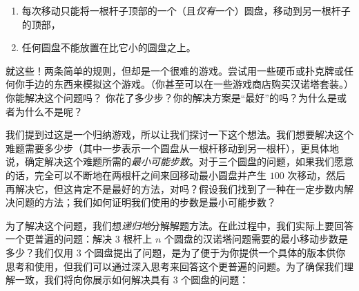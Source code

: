 \begin{enumerate}
    \item 每次移动只能将一根杆子顶部的一个（且\textit{仅有}一个）圆盘，移动到另一根杆子的顶部，
    \item 任何圆盘不能放置在比它小的圆盘之上。
\end{enumerate}
就这些！两条简单的规则，但却是一个很难的游戏。尝试用一些硬币或扑克牌或任何你手边的东西来模拟这个游戏。（你甚至可以在一些游戏商店购买汉诺塔套装。）你能解决这个问题吗？ 你花了多少步？你的解决方案是“最好”的吗？为什么是或者为什么不是呢？

我们提到过这是一个归纳游戏，所以让我们探讨一下这个想法。我们想要解决这个难题需要多少步（其中一步表示一个圆盘从一根杆移动到另一根杆），更具体地说，确定解决这个难题所需的\textit{最小可能步数}。对于三个圆盘的问题，如果我们愿意的话，完全可以不断地在两根杆之间来回移动最小圆盘并产生 $100$ 次移动，然后再解决它，但这肯定不是最好的方法，对吗？假设我们找到了一种在一定步数内解决问题的方法；我们如何证明我们使用的步数是最小可能步数？

为了解决这个问题，我们想\textit{递归地}分解解题方法。在此过程中，我们实际上要回答一个更普遍的问题：解决 $3$ 根杆上 $n$ 个圆盘的汉诺塔问题需要的最小移动步数是多少？我们仅用 $3$ 个圆盘提出了问题，是为了便于为你提供一个具体的版本供你思考和使用，但我们可以通过深入思考来回答这个更普遍的问题。为了确保我们理解一致，我们将向你展示如何解决具有 $3$ 个圆盘的问题：

\begin{center}
\end{center}

